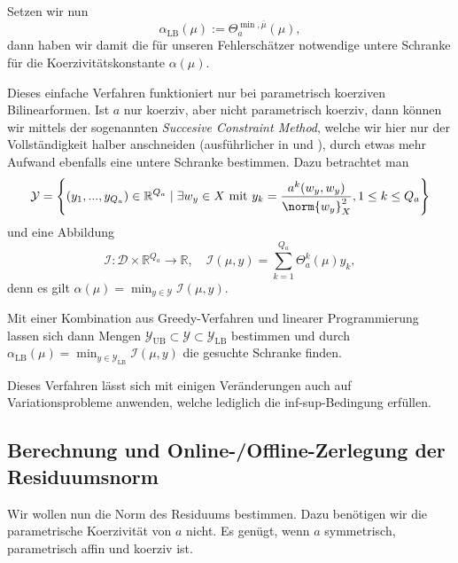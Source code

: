 Setzen wir nun
\begin{equation}
    \alpha_\text{LB}(\mu) := \Theta_a^{\min, \bar \mu}(\mu),
\end{equation}
dann haben wir damit die für unseren Fehlerschätzer notwendige untere Schranke für die Koerzivitätskonstante $\alpha(\mu)$.

Dieses einfache Verfahren funktioniert nur bei parametrisch koerziven Bilinearformen. Ist $a$ nur koerziv, aber nicht parametrisch koerziv, dann können wir mittels der sogenannten \emph{Succesive Constraint Method}, welche wir hier nur der Vollständigkeit halber anschneiden (ausführlicher in \cite{Stamm} und \cite{huynh2007successive}), durch etwas mehr Aufwand ebenfalls eine untere Schranke bestimmen. Dazu betrachtet man
\begin{equation}
    \mathcal Y = \left\{ (y_1, ..., y_{Q_a}) \in \mathbb{R}^{Q_a} \mid \exists w_y \in X \text{ mit } y_k = \frac{a^k(w_y, w_y)}{\norm{w_y}^2_X}, 1 \leq k \leq Q_a \right\}
\end{equation}
und eine Abbildung
\begin{equation}
    \mathcal I \colon \mathcal D \times \mathbb{R}^{Q_a} \to \mathbb{R}, \quad \mathcal I(\mu, y) = \sum_{k=1}^{Q_a} \Theta^k_a(\mu) y_k,
\end{equation}
 denn es gilt $\alpha(\mu) = \min_{y \in \mathcal Y} \mathcal I(\mu, y)$.

Mit einer Kombination aus Greedy-Verfahren und linearer Programmierung lassen sich dann Mengen $\mathcal Y_\text{UB} \subset \mathcal Y \subset \mathcal Y_\text{LB}$ bestimmen und durch $\alpha_\text{LB}(\mu) = \min_{y \in \mathcal Y_\text{LB}} \mathcal I(\mu, y)$ die gesuchte Schranke finden.

Dieses Verfahren lässt sich mit einigen Veränderungen auch auf Variationsprobleme anwenden, welche lediglich die inf-sup-Bedingung erfüllen.


\subsection{Berechnung und Online-/Offline-Zerlegung der Residuumsnorm} %
\label{sub:online_offline_zerlegung_von_norm}

Wir wollen nun die Norm des Residuums bestimmen.
Dazu benötigen wir die parametrische Koerzivität von $a$ nicht.
Es genügt, wenn $a$ symmetrisch, parametrisch affin und koerziv ist.

